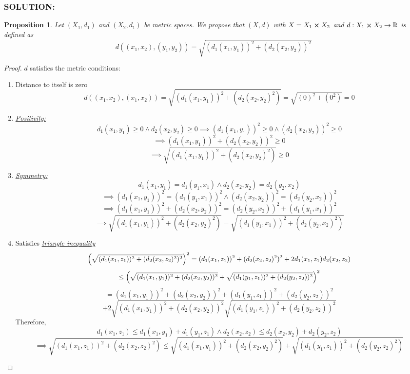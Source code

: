 \documentclass[]{article}
\newcommand{\Solution}{\subsubsection*{\textbf{SOLUTION:}}}
\newcommand{\R}{\mathbb{R}}
\newtheorem{proposition}{Proposition}
\begin{document}
\Solution
\begin{proposition}
    Let $(X_1,d_1)$ and $(X_2,d_1)$ be metric spaces.
    We propose that $(X, d)$ with $X = X_1 \cross X_2$ and $d :  X_1 \cross X_2 \to \R$ is defined as \[
        d((x_1, x_2), (y_1, y_2)) = \sqrt{(d_1(x_1,y_1))^2 + (d_2(x_2,y_2))^2}
    \]
\end{proposition}
\begin{proof}
    $d$ satisfies the metric conditions:
    \begin{enumerate}
        \item Distance to itself is zero \[
            d((x_1, x_2), (x_1, x_2)) = \sqrt{(d_1(x_1,y_1))^2 + (d_2(x_2,y_2)^2)} = \sqrt{(0)^2 + (0^2)} = 0
        \] \item \emph{\underline{Positivity:}} \[
            d_1(x_1,y_1) \geq 0 \land d_2(x_2, y_2) \geq 0 
            \implies (d_1(x_1,y_1))^2 \geq 0 \land (d_2(x_2, y_2))^2 \geq 0
        \]\[    
            \implies (d_1(x_1,y_1))^2 + (d_2(x_2, y_2))^2 \geq 0
        \]\[
            \implies \sqrt{(d_1(x_1,y_1))^2 + (d_2(x_2,y_2)^2)} \geq 0
        \]
         \item \emph{\underline{Symmetry:}} \[
            d_1(x_1,y_1) = d_1(y_1,x_1) \land d_2(x_2, y_2) = d_2(y_2,x_2)
        \]\[
            \implies (d_1(x_1,y_1))^2 = (d_1(y_1,x_1))^2 \land (d_2(x_2, y_2))^2 = (d_2(y_2,x_2))^2
        \]\[
            \implies (d_1(x_1,y_1))^2  + (d_2(x_2, y_2))^2 = (d_2(y_2,x_2))^2 + (d_1(y_1,x_1))^2
        \]\[
            \implies \sqrt{(d_1(x_1,y_1))^2 + (d_2(x_2,y_2)^2)} = \sqrt{(d_1(y_1,x_1))^2 + (d_2(y_2,x_2)^2)}
        \] \item Satisfies \emph{\underline{triangle inequality}} \[
            \qty(\sqrt{(d_1(x_1,z_1))^2 + (d_2(x_2,z_2)^2)^2})^2 = (d_1(x_1,z_1))^2 + (d_2(x_2,z_2)^2)^2 + 2 d_1(x_1,z_1) d_2(x_2,z_2)
        \]\[
            \leq \qty(\sqrt{(d_1(x_1,y_1))^2 + (d_2(x_2,y_2))^2} + \sqrt{(d_1(y_1,z_1))^2 + (d_2(y_2,z_2))^2})^2 
        \]\[
            = (d_1(x_1,y_1))^2 + (d_2(x_2,y_2))^2 + (d_1(y_1,z_1))^2 + (d_2(y_2,z_2))^2 
            \]\[+ 2 \sqrt{(d_1(x_1,y_1))^2 + (d_2(x_2,y_2))^2} \sqrt{(d_1(y_1,z_1))^2 + (d_2(y_2,z_2))^2}
        \] Therefore, \[
            d_1(x_1,z_1) \leq d_1(x_1,y_1) + d_1(y_1,z_1) \land d_2(x_2,z_2) \leq d_2(x_2,y_2) + d_2(y_2,z_2) 
        \]\[
            \implies \sqrt{(d_1(x_1,z_1))^2 + (d_2(x_2,z_2)^2)} \leq \sqrt{(d_1(x_1,y_1))^2 + (d_2(x_2,y_2)^2)} + \sqrt{(d_1(y_1,z_1))^2 + (d_2(y_2,z_2)^2)}
        \]
    \end{enumerate}
\end{proof}
\end{document}
